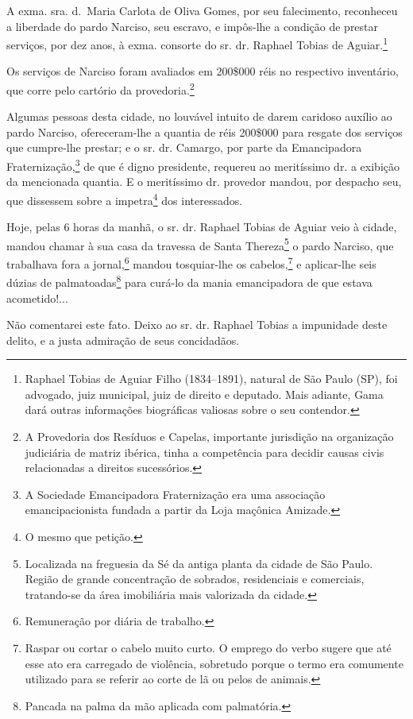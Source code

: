 {\asterisc{}

A exma. sra. d.~Maria Carlota de Oliva Gomes, por seu falecimento,
reconheceu a liberdade do pardo Narciso, seu escravo, e impôs-lhe a
condição de prestar serviços, por dez anos, à exma. consorte do sr. dr.
Raphael Tobias de Aguiar.\footnote{ Raphael Tobias de Aguiar Filho
  (1834--1891), natural de São Paulo (SP), foi advogado, juiz municipal,
  juiz de direito e deputado. Mais adiante, Gama dará outras informações
  biográficas valiosas sobre o seu contendor.}

Os serviços de Narciso foram avaliados em 200\$000 réis no respectivo
inventário, que corre pelo cartório da
provedoria\textsuperscript{⁠}.\footnote{ A Provedoria dos Resíduos e
  Capelas, importante jurisdição na organização judiciária de matriz
  ibérica, tinha a competência para decidir causas civis relacionadas a
  direitos sucessórios.}

Algumas pessoas desta cidade, no louvável intuito de darem caridoso
auxílio ao pardo Narciso, ofereceram-lhe a quantia de réis 200\$000 para
resgate dos serviços que cumpre-lhe prestar; e o sr. dr. Camargo, por
parte da Emancipadora Fraternização\textsuperscript{⁠},\footnote{A
  Sociedade Emancipadora Fraternização era uma associação
  emancipacionista fundada a partir da Loja maçônica Amizade.} de que é
digno presidente, requereu ao meritíssimo dr. a exibição da mencionada
quantia. E o meritíssimo dr. provedor mandou, por despacho seu, que
dissessem sobre a impetra\footnote{ O mesmo que petição.} dos
interessados.

Hoje, pelas 6 horas da manhã, o sr. dr. Raphael Tobias de Aguiar veio à
cidade, mandou chamar à sua casa da travessa de Santa Thereza\footnote{
  Localizada na freguesia da Sé da antiga planta da cidade de São Paulo.
  Região de grande concentração de sobrados, residenciais e comerciais,
  tratando-se da área imobiliária mais valorizada da cidade.} o pardo
Narciso, que trabalhava fora a jornal\textsuperscript{⁠},\footnote{
  Remuneração por diária de trabalho.} mandou tosquiar-lhe os
cabelos,\footnote{ Raspar ou cortar o cabelo muito curto. O emprego
  do verbo sugere que até esse ato era carregado de violência, sobretudo
  porque o termo era comumente utilizado para se referir ao corte de lã
  ou pelos de animais.} e aplicar-lhe seis dúzias de
palmatoadas\footnote{ Pancada na palma da mão aplicada com
  palmatória.} para curá-lo da mania emancipadora de que estava
acometido!...

Não comentarei este fato. Deixo ao sr. dr. Raphael Tobias a impunidade
deste delito, e a justa admiração de seus concidadãos.

}

